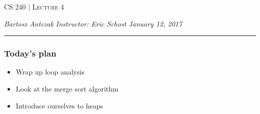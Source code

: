 \documentclass{report}
\newcommand{\lectureNum}{4}
\newcommand{\curDate}{January 12, 2017}
\newcommand{\course}{CS 240}
\begin{document}
\begin{center}
\begin{Large}
\textsc{\course{} | Lecture \lectureNum{}}
\end{Large}
\end{center} 
\noindent \textit{Bartosz Antczak} \hfill
\textit{Instructor: Eric Schost} \hfill
\textit{\curDate{}}
\rule{\textwidth}{0.4pt}

\subsubsection{Today's plan}
\begin{itemize}
\item Wrap up loop analysis
\item Look at the merge sort algorithm
\item Introduce ourselves to heaps
\end{itemize}
\end{document}
